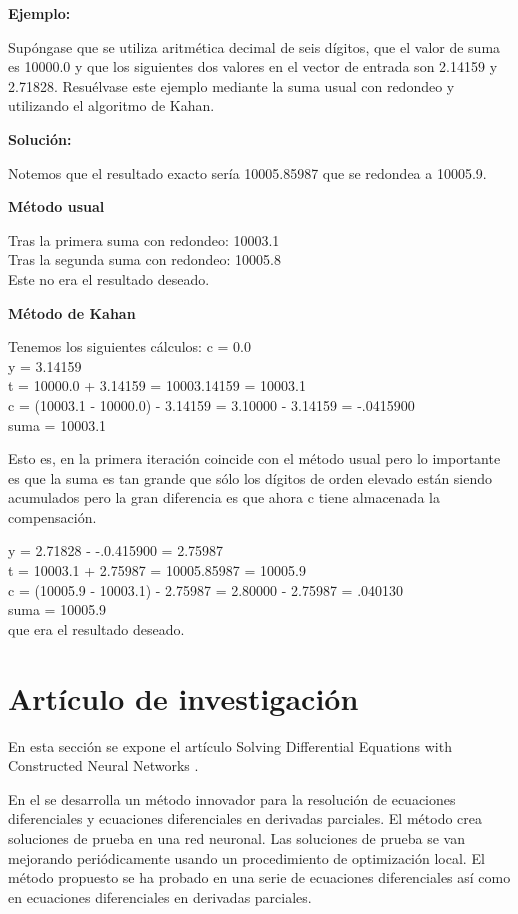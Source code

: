 \documentclass{article}
\theoremstyle{theorem-style}  %
\theoremstyle{definition-style}
\theoremstyle{example-style}
\begin{document}
\textbf{Ejemplo:}

Supóngase que se utiliza aritmética decimal de seis dígitos, que el valor de suma es 10000.0 y que los siguientes dos valores en el vector de entrada son 2.14159 y 2.71828. Resuélvase este ejemplo mediante la suma usual con redondeo y utilizando el algoritmo de Kahan.

\textbf{Solución:}

Notemos que el resultado exacto sería 10005.85987 que se redondea a 10005.9.

\textbf{Método usual}

Tras la primera suma con redondeo: 10003.1 \\
Tras la segunda suma con redondeo: 10005.8 \\
Este no era el resultado deseado.

\textbf{Método de Kahan}

Tenemos los siguientes cálculos:
c = 0.0 \\
y = 3.14159  \\
t = 10000.0 + 3.14159 = 10003.14159 = 10003.1 \\
c = (10003.1 - 10000.0) - 3.14159 = 3.10000 - 3.14159 = -.0415900 \\
suma = 10003.1

Esto es, en la primera iteración coincide con el método usual pero lo importante es que la suma es tan grande que sólo los dígitos de orden elevado están siendo acumulados pero la gran diferencia es que ahora c tiene almacenada la compensación.

y = 2.71828 - -.0.415900 = 2.75987 \\
t = 10003.1 + 2.75987 = 10005.85987 = 10005.9 \\
c = (10005.9 - 10003.1) - 2.75987 = 2.80000 - 2.75987 = .040130 \\
suma = 10005.9 \\

que era el resultado deseado.

\section{Artículo de investigación} \label{sec:paper}

En esta sección se expone el artículo Solving Differential Equations with Constructed Neural Networks \cite{articulo}.

En el se desarrolla un método innovador para la resolución de ecuaciones diferenciales y ecuaciones diferenciales en derivadas parciales. El método crea soluciones de prueba en una red neuronal. Las soluciones de prueba se van mejorando periódicamente usando un procedimiento de optimización local. El método propuesto se ha probado en una serie de ecuaciones diferenciales así como en ecuaciones diferenciales en derivadas parciales.
\end{document}
